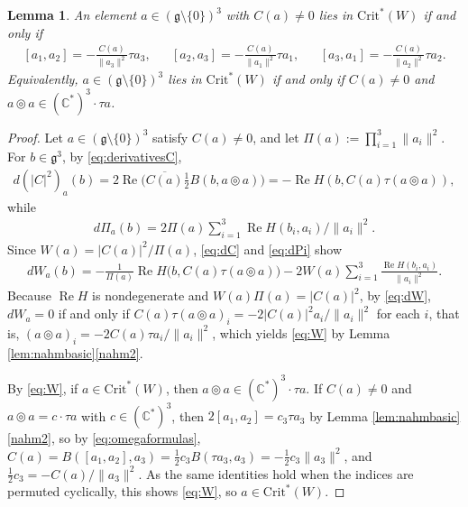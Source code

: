 \documentclass[leqno,10pt]{amsart}
\newtheorem{lemma}[theorem]{Lemma}%
\theoremstyle{definition}
\numberwithin{equation}{section}
\newcommand{\tmlt}{\circledcirc}
\newcommand{\re}{\operatorname{Re}}
\newcommand{\g}{\mathfrak{g}}
\newcommand{\com}{\mathbb C}
\newcommand{\crtnt}{\mathrm{Crit}^*}
\newcommand{\norm}[1]{\lVert #1\rVert}
\begin{document}
\begin{lemma}\label{lem:critW}
An element $a \in (\g \setminus\{0\})^{3}$ with $C(a) \neq 0$ lies in $\crtnt(W)$ if and only if
\begin{align}\label{eq:W}
&[a_{1}, a_{2}] = -\frac{C(a)}{\norm{a_{3}}^{2}}\tau a_{3},&
&[a_{2}, a_{3}] = -\frac{C(a)}{\norm{a_{1}}^{2}}\tau a_{1},&
&[a_{3}, a_{1}] = -\frac{C(a)}{\norm{a_{2}}^{2}}\tau a_{2}.&
\end{align}
Equivalently, $a \in (\g \setminus\{0\})^{3}$ lies in $\crtnt(W)$ if and only if $C(a) \neq 0$ and $a \tmlt a \in (\com^{\ast})^{3}\cdot \tau a$.
\end{lemma}
\begin{proof}
Let $a \in (\g\setminus\{0\})^{3}$ satisfy $C(a) \neq 0$, and let $\Pi(a) := \prod_{i=1}^{3}\norm{a_{i}}^{2}$. For $b \in \g^{3}$, by \eqref{eq:derivativesC}, 
\begin{align}\label{eq:dC}
d(|C|^{2})_{a}(b) = 2\re\big(\overline{C(a)}\tfrac{1}{2}B(b, a \tmlt a)\big) = -\re H(b, C(a)\tau(a \tmlt a)),
\end{align}
while 
\begin{align}\label{eq:dPi}
d\Pi_{a}(b) = 2\Pi(a)\sum_{i=1}^{3}\re H(b_{i}, a_{i})/\norm{a_{i}}^{2}. 
\end{align}
Since $W(a) = |C(a)|^{2}/\Pi(a)$, \eqref{eq:dC} and \eqref{eq:dPi} show 
\begin{align}\label{eq:dW}
dW_{a}(b) = -\frac{1}{\Pi(a)}\re H\big(b, C(a)\tau(a \tmlt a)\big) - 2W(a)\sum_{i=1}^{3}\frac{\re H(b_{i}, a_{i})}{\norm{a_{i}}^{2}}.
\end{align}
Because $\re H$ is nondegenerate and $W(a)\Pi(a) = |C(a)|^{2}$, by \eqref{eq:dW}, $dW_{a} = 0$ if and only if $C(a)\tau(a \tmlt a)_{i} = -2|C(a)|^{2}a_{i}/\norm{a_{i}}^{2}$ for each $i$, that is, $(a \tmlt a)_{i} = -2C(a)\tau a_{i}/\norm{a_{i}}^{2}$, which yields \eqref{eq:W} by Lemma \ref{lem:nahmbasic}\ref{nahm2}.

By \eqref{eq:W}, if $a \in \crtnt(W)$, then $a \tmlt a \in (\com^{\ast})^{3}\cdot \tau a$. If $C(a) \neq 0$ and $a \tmlt a = c \cdot \tau a$ with $c \in (\com^{\ast})^{3}$, then $2[a_{1}, a_{2}] = c_{3}\tau a_{3}$ by Lemma \ref{lem:nahmbasic}\ref{nahm2}, so by \eqref{eq:omegaformulas}, $C(a) = B([a_{1}, a_{2}], a_{3}) = \tfrac{1}{2}c_{3}B(\tau a_{3}, a_{3}) = -\tfrac{1}{2}c_{3}\norm{a_{3}}^{2}$, and $\tfrac{1}{2}c_{3} = -C(a)/\norm{a_{3}}^{2}$. As the same identities hold when the indices are permuted cyclically, this shows \eqref{eq:W}, so $a \in \crtnt(W)$.
\end{proof}
\end{document}
